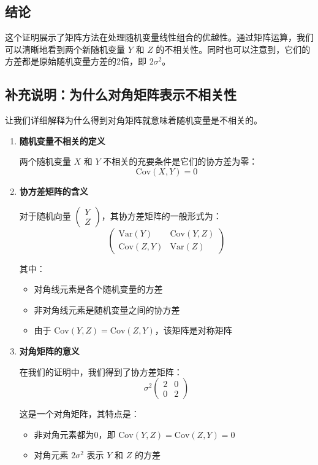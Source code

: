 \documentclass[UTF8]{report}
\theoremstyle{MyLineTheoremStyle} %
\theoremstyle{MyBlockTheoremStyle} %
\theoremstyle{MySubsubsectionStyle} %
\begin{document}
\subsection*{结论}
这个证明展示了矩阵方法在处理随机变量线性组合的优越性。通过矩阵运算，我们可以清晰地看到两个新随机变量 $Y$ 和 $Z$ 的不相关性。同时也可以注意到，它们的方差都是原始随机变量方差的2倍，即 $2\sigma^2$。


\subsection*{补充说明：为什么对角矩阵表示不相关性}

让我们详细解释为什么得到对角矩阵就意味着随机变量是不相关的。

\begin{enumerate}
    \item \textbf{随机变量不相关的定义}
    
    两个随机变量 $X$ 和 $Y$ 不相关的充要条件是它们的协方差为零：
    $$\text{Cov}(X,Y) = 0$$
    
    \item \textbf{协方差矩阵的含义}
    
    对于随机向量 $\begin{pmatrix} Y \\ Z \end{pmatrix}$，其协方差矩阵的一般形式为：
    $$
    \begin{pmatrix} 
    \text{Var}(Y) & \text{Cov}(Y,Z) \\
    \text{Cov}(Z,Y) & \text{Var}(Z)
    \end{pmatrix}
    $$
    
    其中：
    \begin{itemize}
        \item 对角线元素是各个随机变量的方差
        \item 非对角线元素是随机变量之间的协方差
        \item 由于 $\text{Cov}(Y,Z) = \text{Cov}(Z,Y)$，该矩阵是对称矩阵
    \end{itemize}
    
    \item \textbf{对角矩阵的意义}
    
    在我们的证明中，我们得到了协方差矩阵：
    $$
    \sigma^2\begin{pmatrix} 2 & 0 \\ 0 & 2 \end{pmatrix}
    $$
    
    这是一个对角矩阵，其特点是：
    \begin{itemize}
        \item 非对角元素都为0，即 $\text{Cov}(Y,Z) = \text{Cov}(Z,Y) = 0$
        \item 对角元素 $2\sigma^2$ 表示 $Y$ 和 $Z$ 的方差
    \end{itemize}
    

\end{enumerate}
\end{document}
